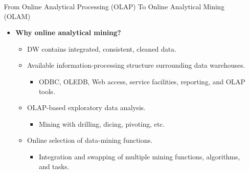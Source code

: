 \begin{frame}{From Online Analytical Processing (OLAP) To Online Analytical Mining (OLAM)}
  \begin{itemize}
  \item \textbf{Why online analytical mining?}
    \begin{itemize}
    \item DW contains integrated, consistent, cleaned data.
    \item Available information-processing structure surrounding data warehouses.
      \begin{itemize}
      \item ODBC, OLEDB, Web access, service facilities, reporting, and OLAP tools.
      \end{itemize}
    \item OLAP-based exploratory data analysis.
      \begin{itemize}
      \item Mining with drilling, dicing, pivoting, etc.
      \end{itemize}
    \item Online selection of data-mining functions.
      \begin{itemize}
      \item Integration and swapping of multiple mining functions, algorithms, and tasks.
      \end{itemize}
    \end{itemize}
  \end{itemize}
\end{frame}
